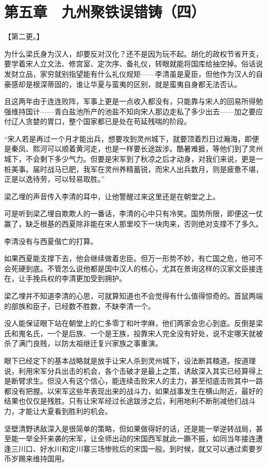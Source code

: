 \section{第五章　九州聚铁误错铸（四）}

【第二更。】

为什么梁氏身为汉人，却要反对汉化？还不是因为玩不起。胡化的政权节省开支，要学着宋人立文法、修宫室、定次序、备礼仪，转眼就能将国库给抽空掉。俗话说发财立品，家穷就别指望能有什么礼仪规矩——李清虽是夏臣，但他作为汉人的自豪感却是根深蒂固的，谁让华夏与蛮夷的区别，就是蛮夷自身都无法否认。

且这两年由于连连败阵，军事上更是一点收入都没有，只能靠与宋人的回易所得勉强维持国计——青白盐池所产的池盐不知向宋人那边走私了多少出去——加之要应付辽人贪婪的胃口，整个国家都已是处在苟延残喘的阶段。

“宋人若是再过一个月才能出兵，想要攻到灵州城下，就要顶着烈日过瀚海，即便是秦凤、熙河可以顺着黄河走，也是一样要长途跋涉。酷暑难捱，等他们到了灵州城下，不会剩下多少气力。但要是宋军到了秋凉之后才动身，对我们来说，更是一桩美事。届时战马已肥，我军在灵州养精蓄锐，而宋人出兵数月，则是疲惫不堪，正是以逸待劳，可以轻易取胜。”

梁乙埋的声音传入李清的耳中，让他警醒过来这里还是在朝堂之上。

可是听到梁乙埋自欺欺人的一番话，李清的心中只有冷笑。国势所限，即便这一仗赢了，缺乏根基的西夏除非能在宋人那里咬下一块肉来，否则绝对支撑不了多久。

李清没有与西夏偕亡的打算。

如果西夏能支撑下去，他会继续做着忠臣。但万一形势不妙，有亡国之危，他可不会死硬到底。不管怎么说他都是国中汉人的核心，尤其在景询这样的汉家文臣接连在，让手挽兵权的李清更加受到拥护。

梁乙埋并不知道李清的心思，可就算知道也不会觉得有什么值得惊奇的。首鼠两端的部族和臣子，已经数不胜数，不缺李清一个。

没人能保证眼下站在朝堂上的仁多零丁和叶孛麻，他们两家会忠心到底。反倒是梁氏和嵬名氏，一个是后族、一个是王族，投靠宋人完全没有好处，说不定哪天就被杀了满门良贱，以防太祖继迁复兴家族之事重演。

眼下已经定下的基本战略就是放手让宋人杀到灵州城下，设法断其粮道。按道理说，利用宋军分兵出击的机会，各个击破才是最上之策，诱敌深入其实已经算得上是断臂求生。但没人有这个信心，能连续击败宋人的主力，甚至彻底击败其中一路都没有把握。以宋军这些年表现出来的战斗力，如果战事发生在横山附近，最好的结果也仅仅是残胜。只有让宋军经过长途跋涉之后，利用地利不断削减他们战斗力，才能让大夏看到胜利的机会。

坚壁清野诱敌深入是很简单的策略，但如果做得好的话，还是能一举逆转战局，甚至能一举全歼来袭的宋军，让全师出动的宋国西军就此一蹶不振，如同当年接连遭逢三川口、好水川和定川寨三场惨败后的宋国一般。到时候，就又可以通过索要岁币岁赐来维持国用。

